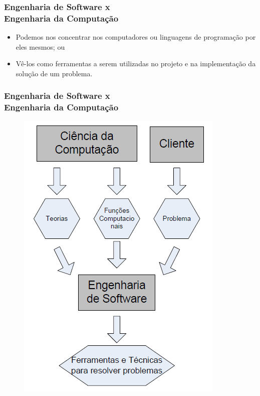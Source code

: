 \begin{frame}
\frametitle{Engenharia de Software x \\ Engenharia da Computação}
\begin{itemize}
\item Podemos nos concentrar nos computadores
ou linguagens de programação por eles mesmos; ou
\item Vê-los como ferramentas a serem utilizadas
no projeto e na implementação da solução de um problema.
\end{itemize}
\end{frame}

\begin{frame}
\frametitle{Engenharia de Software x \\ Engenharia da Computação}
\begin{figure}
 \centering
 \includegraphics[height = \textheight]{figs/fig2.png}
\end{figure}
\end{frame}

